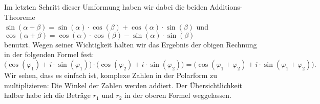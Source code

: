 Im letzten Schritt dieser Umformung haben wir dabei die beiden Additions-Theoreme 
\\[0.2cm]
\hspace*{1.3cm}
$\sin(\alpha + \beta) = \sin(\alpha) \cdot \cos(\beta) + \cos(\alpha) \cdot \sin(\beta)$ \quad und
\\[0.2cm]
\hspace*{1.3cm}
$\cos(\alpha + \beta) = \cos(\alpha) \cdot \cos(\beta) - \sin(\alpha) \cdot \sin(\beta)$
\\[0.2cm]
benutzt.   Wegen seiner Wichtigkeit halten wir das Ergebnis der obigen Rechnung in der folgenden Formel
fest:
\begin{equation}
  \label{eq:komplex_mult2}
  \bigl(\cos(\varphi_1) + i \cdot \sin(\varphi_1)\bigr) \cdot
  \bigl(\cos(\varphi_2) + i \cdot \sin(\varphi_2)\bigr)       
= \bigl(\cos(\varphi_1 + \varphi_2) + i \cdot \sin(\varphi_1 + \varphi_2) \bigr).
\end{equation}
Wir sehen, dass es einfach ist, komplexe Zahlen in der Polarform zu
multiplizieren: Die Winkel der Zahlen werden addiert.  Der \"{U}bersichtlichkeit halber habe ich
die Betr\"{a}ge $r_1$ und $r_2$ in der oberen Formel weggelassen.  

